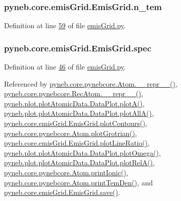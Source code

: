 \subsubsection[{n\+\_\+tem}]{\setlength{\rightskip}{0pt plus 5cm}pyneb.\+core.\+emis\+Grid.\+Emis\+Grid.\+n\+\_\+tem}\label{classpyneb_1_1core_1_1emis_grid_1_1_emis_grid_a7a86bfc0cd3ed0d14ccaf950fb183696}


Definition at line \hyperlink{emis_grid_8py_source_l00059}{59} of file \hyperlink{emis_grid_8py_source}{emis\+Grid.\+py}.

\hypertarget{classpyneb_1_1core_1_1emis_grid_1_1_emis_grid_a78618aff86ea296ecefddcc86d98b687}{}
\subsubsection[{spec}]{\setlength{\rightskip}{0pt plus 5cm}pyneb.\+core.\+emis\+Grid.\+Emis\+Grid.\+spec}\label{classpyneb_1_1core_1_1emis_grid_1_1_emis_grid_a78618aff86ea296ecefddcc86d98b687}


Definition at line \hyperlink{emis_grid_8py_source_l00046}{46} of file \hyperlink{emis_grid_8py_source}{emis\+Grid.\+py}.



Referenced by \hyperlink{pynebcore_8py_source_l02544}{pyneb.\+core.\+pynebcore.\+Atom.\+\_\+\+\_\+repr\+\_\+\+\_\+()}, \hyperlink{pynebcore_8py_source_l03032}{pyneb.\+core.\+pynebcore.\+Rec\+Atom.\+\_\+\+\_\+repr\+\_\+\+\_\+()}, \hyperlink{plot_atomic_data_8py_source_l00116}{pyneb.\+plot.\+plot\+Atomic\+Data.\+Data\+Plot.\+plot\+A()}, \hyperlink{plot_atomic_data_8py_source_l00188}{pyneb.\+plot.\+plot\+Atomic\+Data.\+Data\+Plot.\+plot\+All\+A()}, \hyperlink{emis_grid_8py_source_l00179}{pyneb.\+core.\+emis\+Grid.\+Emis\+Grid.\+plot\+Contours()}, \hyperlink{pynebcore_8py_source_l02372}{pyneb.\+core.\+pynebcore.\+Atom.\+plot\+Grotrian()}, \hyperlink{emis_grid_8py_source_l00238}{pyneb.\+core.\+emis\+Grid.\+Emis\+Grid.\+plot\+Line\+Ratio()}, \hyperlink{plot_atomic_data_8py_source_l00372}{pyneb.\+plot.\+plot\+Atomic\+Data.\+Data\+Plot.\+plot\+Omega()}, \hyperlink{plot_atomic_data_8py_source_l00261}{pyneb.\+plot.\+plot\+Atomic\+Data.\+Data\+Plot.\+plot\+Rel\+A()}, \hyperlink{pynebcore_8py_source_l02167}{pyneb.\+core.\+pynebcore.\+Atom.\+print\+Ionic()}, \hyperlink{pynebcore_8py_source_l02253}{pyneb.\+core.\+pynebcore.\+Atom.\+print\+Tem\+Den()}, and \hyperlink{emis_grid_8py_source_l00096}{pyneb.\+core.\+emis\+Grid.\+Emis\+Grid.\+save()}.

